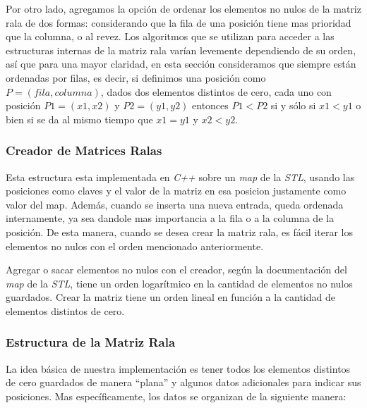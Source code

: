 Por otro lado, agregamos la opción de ordenar los elementos no nulos de la
matriz rala de dos formas: considerando que la fila de una posición tiene mas
prioridad que la columna, o al revez. Los algoritmos que se utilizan para
acceder a las estructuras internas de la matriz rala varían levemente
dependiendo de su orden, así que para una mayor claridad, en esta sección
consideramos que siempre están ordenadas por filas, es decir, si definimos una
posición como $P = (fila, columna)$, dados dos elementos distintos de cero, cada
uno con posición $P1 = (x1, x2)$ y $P2 = (y1, y2)$ entonces $P1 < P2$ si y sólo
si $x1 < y1$ o bien si se da al mismo tiempo que $x1 = y1$ y $x2 < y2$.

\subsubsection{Creador de Matrices Ralas}

Esta estructura esta implementada en \textit{C++} sobre un \textit{map} de la
\textit{STL}, usando las posiciones como claves y el valor de la matriz en esa
posicion justamente como valor del map. Además, cuando se inserta una nueva
entrada, queda ordenada internamente, ya sea dandole mas importancia a la fila
o a la columna de la posición. De esta manera, cuando se desea crear la matriz
rala, es fácil iterar los elementos no nulos con el orden mencionado
anteriormente.

Agregar o sacar elementos no nulos con el creador, según la documentación del
\textit{map} de la \textit{STL}, tiene un orden logarítmico en la cantidad de
elementos no nulos guardados. Crear la matriz tiene un orden lineal en función
a la cantidad de elementos distintos de cero.

\subsubsection{Estructura de la Matriz Rala}

La idea básica de nuestra implementación es tener todos los elementos distintos
de cero guardados de manera ``plana'' y algunos datos adicionales para indicar
sus posiciones. Mas específicamente, los datos se organizan de la siguiente
manera:


